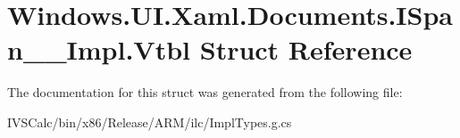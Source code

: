 \hypertarget{struct_windows_1_1_u_i_1_1_xaml_1_1_documents_1_1_i_span_____impl_1_1_vtbl}{}\section{Windows.\+U\+I.\+Xaml.\+Documents.\+I\+Span\+\_\+\+\_\+\+Impl.\+Vtbl Struct Reference}
\label{struct_windows_1_1_u_i_1_1_xaml_1_1_documents_1_1_i_span_____impl_1_1_vtbl}


The documentation for this struct was generated from the following file\+:\begin{DoxyCompactItemize}
\item 
I\+V\+S\+Calc/bin/x86/\+Release/\+A\+R\+M/ilc/Impl\+Types.\+g.\+cs\end{DoxyCompactItemize}
